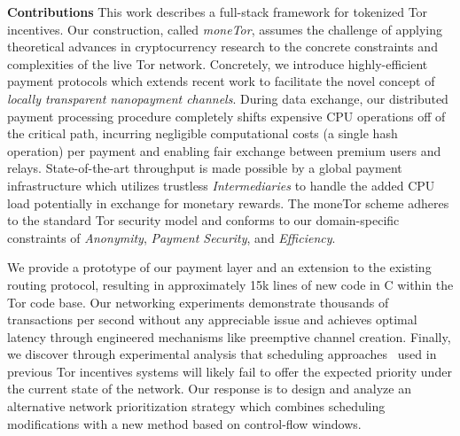 \label{sec:Contributions}
\textbf{Contributions} This work describes a full-stack framework for tokenized
Tor incentives. Our construction, called \emph{moneTor}, assumes the challenge
of applying theoretical advances in cryptocurrency research to the concrete
constraints and complexities of the live Tor network. Concretely, we introduce
highly-efficient payment protocols which extends recent work to facilitate the
novel concept of \emph{locally transparent nanopayment channels}. During data
exchange, our distributed payment processing procedure completely shifts
expensive CPU operations off of the critical path, incurring negligible
computational costs (a single hash operation) per payment and enabling fair
exchange between premium users and relays. State-of-the-art throughput is made
possible by a global payment infrastructure which utilizes trustless
\emph{Intermediaries} to handle the added CPU load potentially in exchange for
monetary rewards. The moneTor scheme adheres to the standard Tor security model
and conforms to our domain-specific constraints of \emph{Anonymity},
\emph{Payment Security}, and \emph{Efficiency}.

We provide a prototype of our payment layer and an extension to the existing
routing protocol, resulting in approximately 15k lines of new code in C within
the Tor code base. Our networking experiments demonstrate thousands of
transactions per second without any appreciable issue and achieves optimal
latency through engineered mechanisms like preemptive channel creation. Finally,
we discover through experimental analysis that scheduling
approaches~\cite{dovrolis1999case, tang2010improved} used in previous Tor
incentives systems will likely fail to offer the expected priority under the
current state of the network. Our response is to design and analyze an
alternative network prioritization strategy which combines scheduling
modifications with a new method based on control-flow windows.


